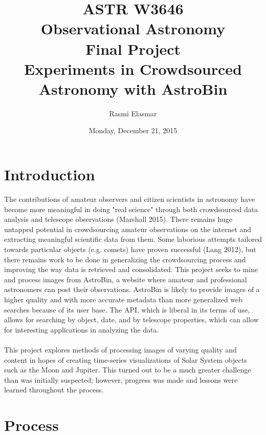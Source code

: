 \documentclass[]{article}
\begin{document}
\title{ASTR W3646 \\ Observational Astronomy \\ Final Project \\ Experiments in Crowdsourced Astronomy with AstroBin}
\author{Rasmi Elasmar}
\date{Monday, December 21, 2015}
\maketitle
\section*{Introduction}
The contributions of amateur observers and citizen scientists in astronomy have become more meaningful in doing "real science" through both crowdsourced data analysis and telescope observations (Marshall 2015). There remains huge untapped potential in crowdsourcing amateur observations on the internet and extracting meaningful scientific data from them. Some laborious attempts tailored towards particular objects (e.g. comets) have proven successful (Lang 2012), but there remains work to be done in generalizing the crowdsourcing process and improving the way data is retrieved and consolidated. This project seeks to mine and process images from AstroBin, a website where amateur and professional astronomers can post their observations. AstroBin is likely to provide images of a higher quality and with more accurate metadata than more generalized web searches because of its user base. The API, which is liberal in its terms of use, allows for searching by object, date, and by telescope properties, which can allow for interesting applications in analyzing the data. 
\\\\
This project explores methods of processing images of varying quality and content in hopes of creating time-series visualizations of Solar System objects such as the Moon and Jupiter. This turned out to be a much greater challenge than was initially suspected; however, progress was made and lessons were learned throughout the process.
\section*{Process}
\end{document}
